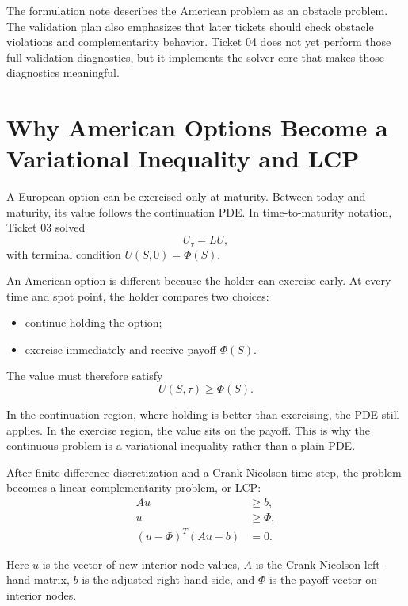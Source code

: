 \documentclass[11pt,a4paper]{article}
\begin{document}
The formulation note describes the American problem as an obstacle problem. The validation plan
also emphasizes that later tickets should check obstacle violations and complementarity behavior.
Ticket 04 does not yet perform those full validation diagnostics, but it implements the solver core
that makes those diagnostics meaningful.

\section{Why American Options Become a Variational Inequality and LCP}

A European option can be exercised only at maturity. Between today and maturity, its value follows
the continuation PDE. In time-to-maturity notation, Ticket 03 solved
\begin{equation}
  U_{\tau} = L U,
\end{equation}
with terminal condition \(U(S,0)=\Phi(S)\).

An American option is different because the holder can exercise early. At every time and spot
point, the holder compares two choices:
\begin{itemize}
  \item continue holding the option;
  \item exercise immediately and receive payoff \(\Phi(S)\).
\end{itemize}

The value must therefore satisfy
\begin{equation}
  U(S,\tau) \geq \Phi(S).
  \label{eq:obstacle}
\end{equation}

In the continuation region, where holding is better than exercising, the PDE still applies. In the
exercise region, the value sits on the payoff. This is why the continuous problem is a
variational inequality rather than a plain PDE.

After finite-difference discretization and a Crank-Nicolson time step, the problem becomes a
linear complementarity problem, or LCP:
\begin{align}
  A u &\geq b, \\
  u &\geq \Phi, \\
  (u-\Phi)^T(Au-b) &= 0.
  \label{eq:lcp}
\end{align}

Here \(u\) is the vector of new interior-node values, \(A\) is the Crank-Nicolson left-hand
matrix, \(b\) is the adjusted right-hand side, and \(\Phi\) is the payoff vector on interior
nodes.
\end{document}
